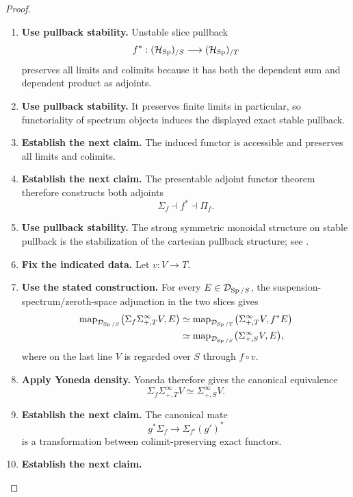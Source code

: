 \begin{proof}
\leavevmode
\begin{enumerate}[label=\textup{(\arabic*)}]
    \item \textbf{Use pullback stability.}
    Unstable slice pullback
    \[
    f^*:(\mathcal H_{\operatorname{Sp}})_{/S}\longrightarrow(\mathcal H_{\operatorname{Sp}})_{/T}
    \]
    preserves all limits and colimits because it has both the dependent sum and
    dependent product as adjoints.
    \item \textbf{Use pullback stability.}
    It preserves finite limits in particular, so
    functoriality of spectrum objects induces the displayed exact stable pullback.
    \item \textbf{Establish the next claim.}
    The induced functor is accessible and preserves all limits and colimits.
    \item \textbf{Establish the next claim.}
    The
    presentable adjoint functor theorem therefore constructs both adjoints
    \[
    \Sigma_f\dashv f^*\dashv\Pi_f.
    \]
    \item \textbf{Use pullback stability.}
    The strong symmetric monoidal structure on stable pullback is the stabilization
    of the cartesian pullback structure; see \cite{LurieHigherAlgebra}.
    \item \textbf{Fix the indicated data.}
    Let \(v:V\to T\).
    \item \textbf{Use the stated construction.}
    For every \(E\in\mathcal D_{\operatorname{Sp}/S}\), the
    suspension-spectrum/zeroth-space adjunction in the two slices gives
    \[
    \begin{aligned}
    \operatorname{map}_{\mathcal D_{\operatorname{Sp}/S}}
    \bigl(\Sigma_f\Sigma^\infty_{+,T}V,E\bigr)
    &\simeq
    \operatorname{map}_{\mathcal D_{\operatorname{Sp}/T}}
    \bigl(\Sigma^\infty_{+,T}V,f^*E\bigr)\\
    &\simeq
    \operatorname{map}_{\mathcal D_{\operatorname{Sp}/S}}
    \bigl(\Sigma^\infty_{+,S}V,E\bigr),
    \end{aligned}
    \]
    where on the last line \(V\) is regarded over \(S\) through \(f\circ v\).
    \item \textbf{Apply Yoneda density.}
    Yoneda therefore gives the canonical equivalence
    \[
    \Sigma_f\Sigma^\infty_{+,T}V
    \simeq
    \Sigma^\infty_{+,S}V.
    \]
    \item \textbf{Establish the next claim.}
    The canonical mate
    \[
    g^*\Sigma_f\longrightarrow\Sigma_{f'}(g')^*
    \]
    is a transformation between colimit-preserving exact functors.
    \item \textbf{Establish the next claim.}

\end{enumerate}
\end{proof}
